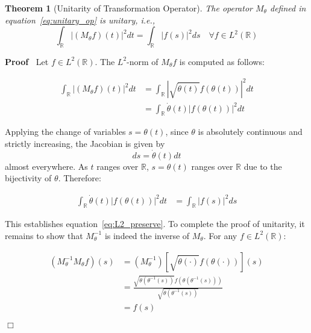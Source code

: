 \documentclass{article}
\newcommand{\cdummy}{\cdot}
\newenvironment{proof}{\noindent\textbf{Proof\ }}{\hspace*{\fill}$\Box$\medskip}
\newtheorem{theorem}{Theorem}
\begin{document}
\begin{theorem}
  [Unitarity of Transformation Operator]\label{thm:unitary} The operator
  $M_{\theta}$ defined in equation~\eqref{eq:unitary_op} is unitary, i.e.,
  \begin{equation}
    \label{eq:L2_preserve} \int_{\mathbb{R}} | (M_{\theta} f) (t) |^2 dt =
    \int_{\mathbb{R}} |f (s) |^2 ds \quad \forall f \in L^2 (\mathbb{R})
  \end{equation}
\end{theorem}

\begin{proof}
  Let $f \in L^2 (\mathbb{R})$. The $L^2$-norm of $M_{\theta} f$ is computed
  as follows:
  
  \begin{align}
    \int_{\mathbb{R}} | (M_{\theta} f) (t) |^2 dt & = \int_{\mathbb{R}} \left|
    \sqrt{\dot{\theta} (t)} f (\theta (t)) \right|^2 dt \\
    & = \int_{\mathbb{R}} \dot{\theta} (t) |f (\theta (t)) |^2 dt 
  \end{align}
  
  Applying the change of variables $s = \theta (t)$, since $\theta$ is
  absolutely continuous and strictly increasing, the Jacobian is given by
  \begin{equation}
    ds = \dot{\theta} (t) dt
  \end{equation}
  almost everywhere. As $t$ ranges over $\mathbb{R}$, $s = \theta (t)$ ranges
  over $\mathbb{R}$ due to the bijectivity of $\theta$. Therefore:
  
  \begin{align}
    \int_{\mathbb{R}} \dot{\theta} (t) |f (\theta (t)) |^2 dt & =
    \int_{\mathbb{R}} |f (s) |^2 ds 
  \end{align}
  
  This establishes equation~\eqref{eq:L2_preserve}. To complete the proof of
  unitarity, it remains to show that $M_{\theta}^{- 1}$ is indeed the inverse
  of $M_{\theta}$. For any $f \in L^2 (\mathbb{R})$:
  
  \begin{align}
    (M_{\theta}^{- 1} M_{\theta} f) (s) & = (M_{\theta}^{- 1})  \left[
    \sqrt{\dot{\theta} (\cdummy)} f (\theta (\cdot)) \right] (s) \\
    & = \frac{\sqrt{\dot{\theta} (\theta^{- 1} (s))} f (\theta (\theta^{- 1}
    (s)))}{\sqrt{\dot{\theta} (\theta^{- 1} (s))}} \\
    & = f (s) 
  \end{align}
  

\end{proof}
\end{document}
